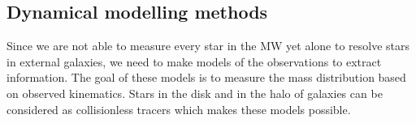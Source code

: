 \iffalse
\subsubsection{Application}
MW \acp{GC} proper motions and dynamics (including action distribution and dynamical model of potentials): \cite{Vasiliev...GCdynsGaiaDR2...2018}\\
Modelling the \ac{MW}'s \ac{GC} system: \cite{Binney...GCsystem...2017}
\fi
\subsection{Dynamical modelling methods}
Since we are not able to measure every star in the \ac{MW} yet alone to resolve stars in external galaxies, we need to make models of the observations to extract information. The goal of these models is to measure the mass distribution based on observed kinematics. Stars in the disk and in the halo of galaxies can be considered as collisionless tracers which makes these models possible. 
